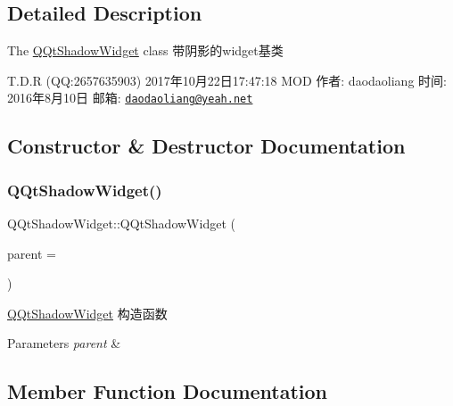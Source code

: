 \subsection{Detailed Description}
The \mbox{\hyperlink{class_q_qt_shadow_widget}{Q\+Qt\+Shadow\+Widget}} class 带阴影的widget基类 

T.\+D.\+R (QQ\+:2657635903) 2017年10月22日17\+:47\+:18 M\+OD 作者\+: daodaoliang 时间\+: 2016年8月10日 邮箱\+: \href{mailto:daodaoliang@yeah.net}{\tt daodaoliang@yeah.\+net} 

\subsection{Constructor \& Destructor Documentation}
\mbox{\label{class_q_qt_shadow_widget_a5cbf4811b45072217ce88a1bd3b4c825}} 
\subsubsection{\texorpdfstring{Q\+Qt\+Shadow\+Widget()}{QQtShadowWidget()}}
{\footnotesize\ttfamily Q\+Qt\+Shadow\+Widget\+::\+Q\+Qt\+Shadow\+Widget (\begin{DoxyParamCaption}\item[{Q\+Widget $\ast$}]{parent = {} }\end{DoxyParamCaption})\hspace{0.3cm}{\ttfamily [explicit]}}



\mbox{\hyperlink{class_q_qt_shadow_widget}{Q\+Qt\+Shadow\+Widget}} 构造函数 


\begin{DoxyParams}{Parameters}
{\em parent} & \\
\hline
\end{DoxyParams}


\subsection{Member Function Documentation}
\mbox{\label{class_q_qt_shadow_widget_a92ef80fecafaff500b60b31a0d9ca460}} 
